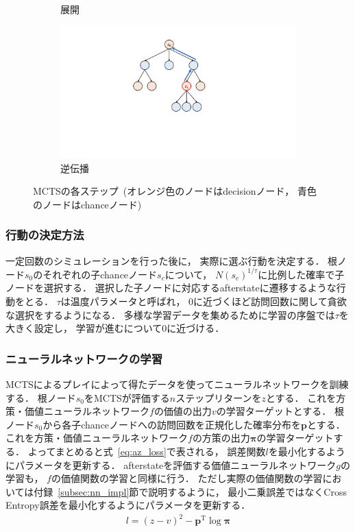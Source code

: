 \begin{figure}
\begin{subfigure}[T]{0.4\columnwidth}
    \caption{展開}
    \label{fig:expand}
  \end{subfigure}
  \hspace{3cm}
  \begin{subfigure}[T]{0.4\columnwidth}
    \centering
    \includegraphics[width=\columnwidth]{figures/backpropagate_.pdf}
    \caption{逆伝播}
    \label{fig:backpropagate}
  \end{subfigure}
  \caption{MCTSの各ステップ~(オレンジ色のノードはdecisionノード， 青色のノードはchanceノード)}
  \label{fig:mcts}
\end{figure}

\subsubsection*{行動の決定方法}
一定回数のシミュレーションを行った後に， 実際に選ぶ行動を決定する．
根ノード$s_0$のそれぞれの子chanceノード$s_c$について， $N(s_c)^{1/\tau}$に比例した確率で子ノードを選択する．
選択した子ノードに対応するafterstateに遷移するような行動をとる．
$\tau$は温度パラメータと呼ばれ， $0$に近づくほど訪問回数に関して貪欲な選択をするようになる．
多様な学習データを集めるために学習の序盤では$\tau$を大きく設定し， 学習が進むについて$0$に近づける．

\subsubsection*{ニューラルネットワークの学習}
MCTSによるプレイによって得たデータを使ってニューラルネットワークを訓練する．
根ノード$s_0$をMCTSが評価する$n$ステップリターンを$z$とする．
これを方策・価値ニューラルネットワーク$f$の価値の出力$v$の学習ターゲットとする．
根ノード$s_0$から各子chanceノードへの訪問回数を正規化した確率分布を$\pmb{p}$とする．
これを方策・価値ニューラルネットワーク$f$の方策の出力$\pmb{\pi}$の学習ターゲットする．
よってまとめると式~\ref{eq:az_loss}で表される， 誤差関数$l$を最小化するようにパラメータを更新する．
afterstateを評価する価値ニューラルネットワーク$g$の学習も， $f$の価値関数の学習と同様に行う．
ただし実際の価値関数の学習においては付録~\ref{subsec:nn_impl}節で説明するように， 最小二乗誤差ではなくCross Entropy誤差を最小化するようにパラメータを更新する．
\begin{align}
\label{eq:az_loss}
l = (z-v)^2 - \pmb{p}^{\mathrm{T}} \log \pmb{\pi}
\end{align}

